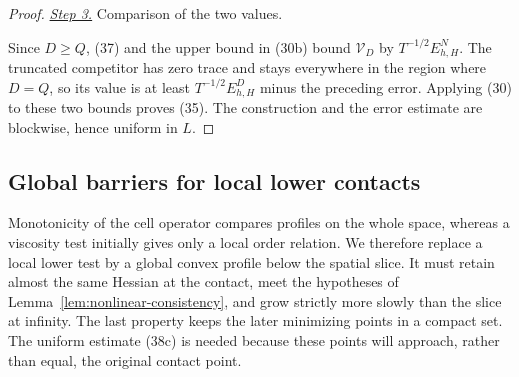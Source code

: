 \documentclass{aomart}
\theoremstyle{definition}
\newcommand{\1}{\mathbf 1}
\begin{document}
\begin{proof}
\smallskip\noindent
\underline{\textit{Step 3.}} Comparison of the two values.

Since $D\geq Q$, (37) and the upper bound in (30b) bound
$\mathcal V_D$ by $T^{-1/2}E_{h,H}^N$.  The truncated competitor has
zero trace and stays everywhere in the region where $D=Q$, so its
value is at least $T^{-1/2}E_{h,H}^D$ minus the preceding error.
Applying (30) to these two bounds proves (35).  The construction and
the error estimate are blockwise, hence uniform in $L$.

\end{proof}

\subsection{Global barriers for local lower contacts}

Monotonicity of the cell operator compares profiles on the whole
space, whereas a viscosity test initially gives only a local order
relation.  We therefore replace a local lower test by a global convex
profile below the spatial slice.  It must retain almost the same
Hessian at the contact, meet the hypotheses of
Lemma~\ref{lem:nonlinear-consistency}, and grow strictly more slowly
than the slice at infinity.  The last property keeps the later
minimizing points in a compact set.  The uniform estimate (38c) is
needed because these points will approach, rather than equal, the
original contact point.
\end{document}
